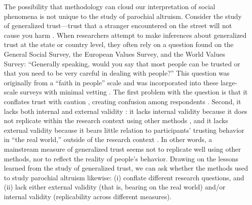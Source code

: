 \documentclass[bibauthoryear]{aa}
\begin{document}
The possibility that methodology can cloud our interpretation of social phenomena is not unique to the study of parochial altruism. Consider the study of generalized trust---trust that a stranger encountered on the street will not cause you harm \citep{yamagishi2011trust}. When researchers attempt to make inferences about generalized trust at the state or country level, they often rely on a question found on the General Social Survey, the European Values Survey, and the World Values Survey: ``Generally speaking, would you say that most people can be trusted or that you need to be very careful in dealing with people?'' This question was originally from a ``faith in people'' scale and was incorporated into these large-scale surveys with minimal vetting \citep{miller2003surveys}. The first problem with the question is that it conflates trust with caution \citep{miller2003surveys}, creating confusion among respondents \citep{nannestad2008have}. Second, it lacks both internal and external validity \citep{loewenstein1999experimental}: it lacks internal validity because it does not replicate within the research context using other methods \citep{glaeser2000measuring}, and it lacks external validity because it bears little relation to participants' trusting behavior in ``the real world,'' outside of the research context \citep{nannestad2008have}. In other words, a  mainstream measure of generalized trust seems not to replicate well using other methods, nor to reflect the reality of people's behavior. Drawing on the lessons learned from the study of generalized trust, we can ask whether the methods used to study parochial altruism likewise: (i) conflate different research questions, and (ii) lack either external validity (that is, bearing on the real world) and/or internal validity (replicability across different measures). 
\end{document}
